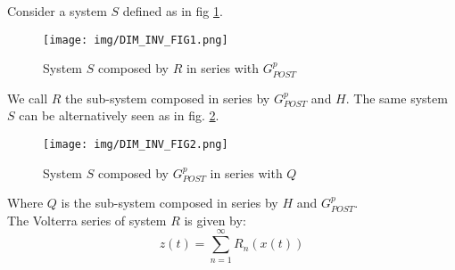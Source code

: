 Consider a system $S$  defined as in fig \ref{fig:Dim_S_1}.
\begin{figure}[h]\centering
\texttt{[image: img/DIM\_INV\_FIG1.png]} 
\caption{System $S$ composed by $R$ in series with $G_{POST}^p$} \label{fig:Dim_S_1}
\end{figure}
We call $R$ the sub-system composed in series by $G_{POST}^p$ and $H$. The same system $S$ can be alternatively seen as in fig. \ref{fig:Dim_S_2}.
\begin{figure}[h]\centering
\texttt{[image: img/DIM\_INV\_FIG2.png]} 
\caption{System $S$ composed by $G_{POST}^p$ in series with $Q$ } \label{fig:Dim_S_2}
\end{figure}
Where $Q$ is the sub-system composed in series by $H$ and $G_{POST}^p$.\\
The Volterra series of system $R$ is given by:
\begin{equation}
z(t) = \sum_{n=1}^\infty R_n (x (t))
\end{equation}

